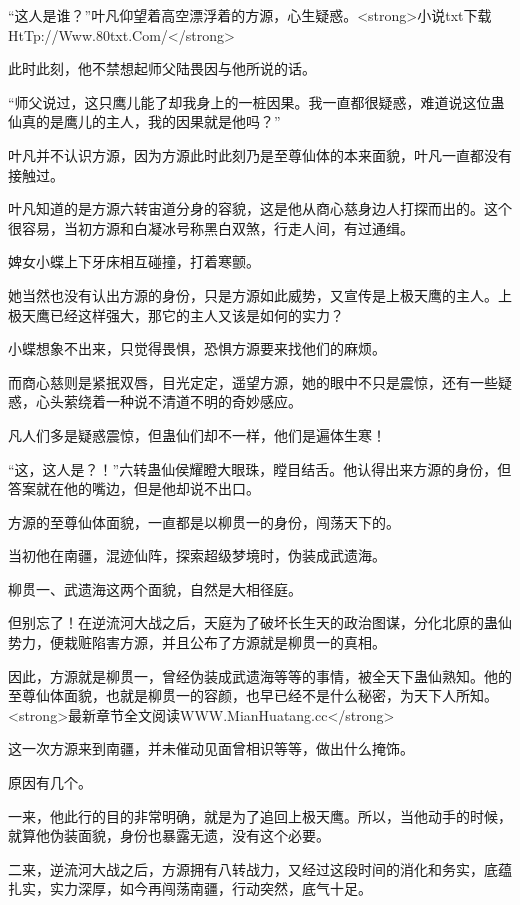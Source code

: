 
\begin{this_body}

“这人是谁？”叶凡仰望着高空漂浮着的方源，心生疑惑。<strong>小说txt下载HtTp://Www.80txt.Com/</strong>

此时此刻，他不禁想起师父陆畏因与他所说的话。

“师父说过，这只鹰儿能了却我身上的一桩因果。我一直都很疑惑，难道说这位蛊仙真的是鹰儿的主人，我的因果就是他吗？”

叶凡并不认识方源，因为方源此时此刻乃是至尊仙体的本来面貌，叶凡一直都没有接触过。

叶凡知道的是方源六转宙道分身的容貌，这是他从商心慈身边人打探而出的。这个很容易，当初方源和白凝冰号称黑白双煞，行走人间，有过通缉。

婢女小蝶上下牙床相互碰撞，打着寒颤。

她当然也没有认出方源的身份，只是方源如此威势，又宣传是上极天鹰的主人。上极天鹰已经这样强大，那它的主人又该是如何的实力？

小蝶想象不出来，只觉得畏惧，恐惧方源要来找他们的麻烦。

而商心慈则是紧抿双唇，目光定定，遥望方源，她的眼中不只是震惊，还有一些疑惑，心头萦绕着一种说不清道不明的奇妙感应。

凡人们多是疑惑震惊，但蛊仙们却不一样，他们是遍体生寒！

“这，这人是？！”六转蛊仙侯耀瞪大眼珠，瞠目结舌。他认得出来方源的身份，但答案就在他的嘴边，但是他却说不出口。

方源的至尊仙体面貌，一直都是以柳贯一的身份，闯荡天下的。

当初他在南疆，混迹仙阵，探索超级梦境时，伪装成武遗海。

柳贯一、武遗海这两个面貌，自然是大相径庭。

但别忘了！在逆流河大战之后，天庭为了破坏长生天的政治图谋，分化北原的蛊仙势力，便栽赃陷害方源，并且公布了方源就是柳贯一的真相。

因此，方源就是柳贯一，曾经伪装成武遗海等等的事情，被全天下蛊仙熟知。他的至尊仙体面貌，也就是柳贯一的容颜，也早已经不是什么秘密，为天下人所知。<strong>最新章节全文阅读WWW.MianHuatang.cc</strong>

这一次方源来到南疆，并未催动见面曾相识等等，做出什么掩饰。

原因有几个。

一来，他此行的目的非常明确，就是为了追回上极天鹰。所以，当他动手的时候，就算他伪装面貌，身份也暴露无遗，没有这个必要。

二来，逆流河大战之后，方源拥有八转战力，又经过这段时间的消化和务实，底蕴扎实，实力深厚，如今再闯荡南疆，行动突然，底气十足。


\end{this_body}
